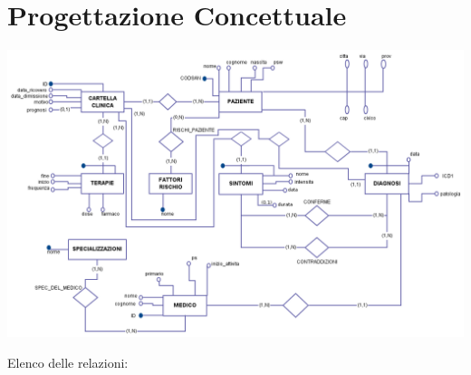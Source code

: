 \documentclass[a4paper,titlepage]{article}
\begin{document}
\begin{frontespizio}


\end{frontespizio}

\tableofcontents

\newpage

\part{Progettazione Concettuale}

\vfill
    \begin{center}
	
\centerline{
    \includegraphics[scale=0.45]{ER.png}
}
    \end{center}
\vfill
\newpage
{\large Elenco delle relazioni:\newline}
\end{document}
